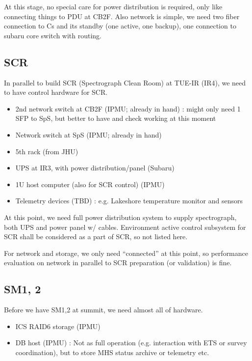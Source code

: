\documentclass[a4paper,notitlepage]{article}
\begin{document}
At this stage, no special care for power distribution is required, 
only like connecting things to PDU at CB2F. Also network is simple, 
we need two fiber connection to Cs and its standby (one active, one backup), 
one connection to subaru core switch with routing.

\subsection{SCR}

In parallel to build SCR (Spectrograph Clean Room) at TUE-IR (IR4), 
we need to have control hardware for SCR.

\begin{itemize}
  \item 2nd network switch at CB2F (IPMU; already in hand)
    : might only need 1 SFP to SpS, 
    but better to have and check working at this moment
  \item Network switch at SpS (IPMU; already in hand)
  \item 5th rack (from JHU)
  \item UPS at IR3, with power distribution/panel (Subaru)
  \item 1U host computer (also for SCR control) (IPMU)
  \item Telemetry devices (TBD)
    : e.g. Lakeshore temperature monitor and sensors
\end{itemize}

At this point, we need full power distribution system to supply 
spectrograph, both UPS and power panel w/ cables. Environment 
active control subsystem for SCR shall be considered as a part of 
SCR, so not listed here.

For network and storage, we only need “connected” at this point, 
so performance evaluation on network in parallel to SCR preparation 
(or validation) is fine.

\subsection{SM1, 2}

Before we have SM1,2 at summit, we need almost all of hardware. 

\begin{itemize}
  \item ICS RAID6 storage (IPMU)
  \item DB host (IPMU)
    : Not as full operation (e.g. interaction with ETS or survey coordination), 
    but to store MHS status archive or telemetry etc.
\end{itemize}
\end{document}
